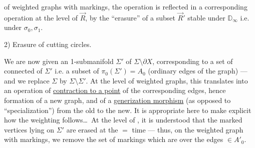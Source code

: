 of weighted graphs with markings, the operation 
is reflected in a corresponding operation at the level of $\vec R$, by the ``erasure'' of a subset $\vec R'$ stable under $\mathbb D_\infty$ i.e. under $\sigma_0,\sigma_1$.

2) Erasure of cutting circles.

We are now given an    1-submanifold
$\Sigma'$ of $\Sigma\setminus\partial X$,
corresponding to a set  of connected  of $\Sigma'$ i.e. a subset  of $\pi_0(\Sigma')=A_0$
(ordinary edges of the graph) --- and we replace $\Sigma$ by $\Sigma\setminus\Sigma'$.
At the level of weighted graphs, this translates into an operation of \uline{contraction to a point} of the corresponding edges, hence formation of a new graph, and of a \uline{generization morphism} (as opposed to ``specialization'') from the old to the new.
It is appropriate here to make explicit how the weighting follows\ldots\
At the level of  , it is understood that the marked vertices lying on $\Sigma'$ are erased at the $=$ time --- thus, on the weighted graph with markings, we remove the set of markings which are over the edges $\in A'_0$.
\mspage{53}
